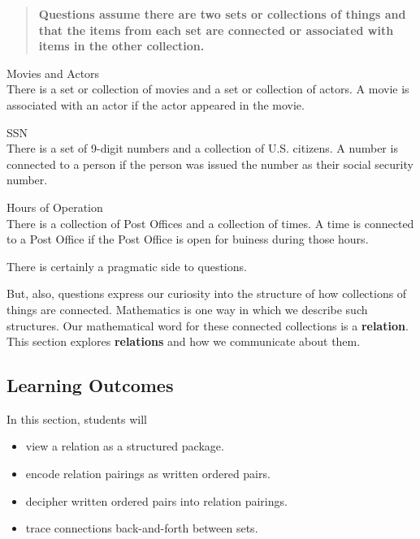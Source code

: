 \documentclass{ximera}
\begin{document}
\begin{quote} 
\textbf{\textcolor{green!50!black}{Questions assume there are two sets or collections of things and that the items from each set are connected or associated with items in the other collection.}} 
\end{quote}


\begin{example} Movies and Actors \\
There is a set or collection of movies and a set or collection of actors.  A movie is associated with an actor if the actor appeared in the movie.
\end{example}

\begin{example} SSN \\
There is a set of 9-digit numbers and a collection of U.S. citizens.  A number is connected to a person if the person was issued the number as their social security number.
\end{example}

\begin{example} Hours of Operation \\
There is a collection of Post Offices and a collection of times.  A time is connected to a Post Office if the Post Office is open for buiness during those hours.
\end{example}

There is certainly a pragmatic side to questions.


But, also, questions express our curiosity into the structure of how collections of things are connected. Mathematics is one way in which we describe such structures. Our mathematical word for these connected collections is a \textbf{\textcolor{blue!75!black}{relation}}. \\


This section explores \textbf{\textcolor{blue!75!black}{relations}} and how we communicate about them. \\










\subsection{Learning Outcomes}

\begin{sectionOutcomes}
In this section, students will 

\begin{itemize}
\item view a relation as a structured package.
\item encode relation pairings as written ordered pairs.
\item decipher written ordered pairs into relation pairings.
\item trace connections back-and-forth between sets.
\end{itemize}
\end{sectionOutcomes}
\end{document}
